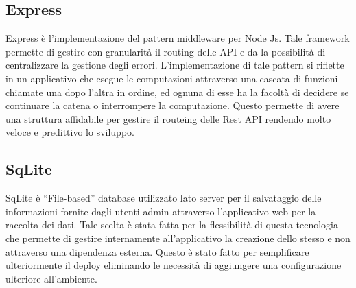 \subsection{Express}\vspace{5mm}

	Express è l'implementazione del pattern middleware per Node Js. Tale framework permette di gestire con granularità il routing delle API e da la possibilità di centralizzare la gestione degli errori. L'implementazione di tale pattern si riflette in un applicativo che esegue le computazioni attraverso una cascata di funzioni chiamate una dopo l'altra in ordine, ed ognuna di esse ha la facoltà di decidere se continuare la catena o interrompere la computazione. Questo permette di avere una struttura affidabile per gestire il routeing delle Rest API rendendo molto veloce e predittivo lo sviluppo.\vspace{5mm}

\subsection{SqLite}\vspace{5mm}

	SqLite è “File-based” database utilizzato lato server per il salvataggio delle informazioni fornite dagli utenti admin attraverso l’applicativo web per la raccolta dei dati. Tale scelta è stata fatta per la flessibilità di questa tecnologia che permette di gestire internamente all’applicativo la creazione dello stesso e non attraverso una dipendenza esterna. Questo è stato fatto per semplificare ulteriormente il deploy eliminando le necessità di aggiungere una configurazione ulteriore all’ambiente.\vspace{5mm}


